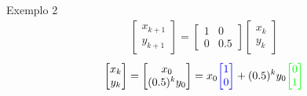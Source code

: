 \documentclass{beamer}
\begin{document}
\begin{frame}{Exemplo 2}
  \begin{gather*}
    \begin{bmatrix}
      x_{k+1} \\ y_{k+1} 
    \end{bmatrix} = \begin{bmatrix}
      1 & 0 \\ 0 & 0.5
    \end{bmatrix}\begin{bmatrix}
      x_k \\ y_k
    \end{bmatrix}
  \end{gather*}
  \begin{gather*}
  \begin{bmatrix}
    x_k \\ y_k 
  \end{bmatrix} =\begin{bmatrix}
    x_0 \\ (0.5)^k y_0
  \end{bmatrix} = x_0\textcolor{blue}{\begin{bmatrix}
    1 \\ 0
  \end{bmatrix}} + (0.5)^k y_0 \textcolor{green}{\begin{bmatrix}
    0 \\ 1
  \end{bmatrix}}
\end{gather*}
\end{frame}
\end{document}
